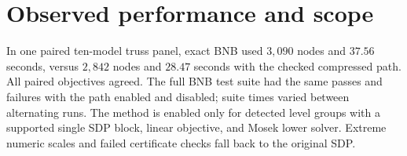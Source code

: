 \documentclass[10pt,a4paper]{article}
\begin{document}
\section*{Observed performance and scope}
In one paired ten-model truss panel, exact BNB used $3{,}090$ nodes and
$37.56$ seconds, versus $2{,}842$ nodes and $28.47$ seconds with the
checked compressed path.  All paired objectives agreed.  The full BNB
test suite had the same passes and failures with the path enabled and
disabled; suite times varied between alternating runs.  The method is
enabled only for detected level groups with a supported single SDP block,
linear objective, and Mosek lower solver.  Extreme numeric scales and
failed certificate checks fall back to the original SDP.
\end{document}
